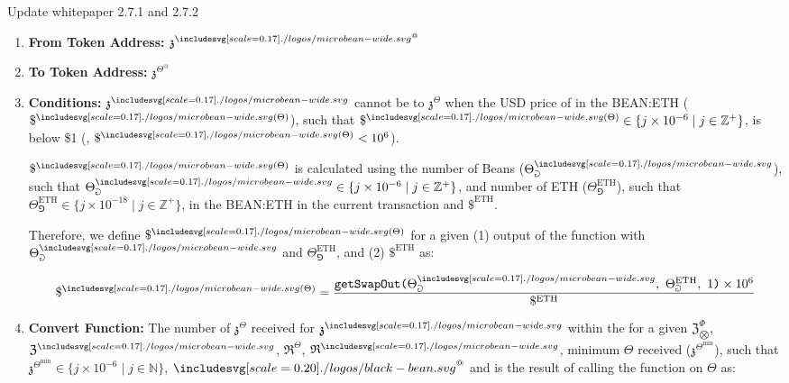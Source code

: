 Update whitepaper 2.7.1 and 2.7.2\documentclass[class=article, crop=false]{standalone}
\begin{document}
\begin{enumerate}
    \item \textbf{From Token Address:} $\mathfrak{z}^{\bean^@}$
    
    \item \textbf{To Token Address:} $\mathfrak{z}^{\Theta^@}$
    
    \item \textbf{Conditions:}  \hyperlink{ht233}{$\mathfrak{z}^{\bean}$} cannot be  to  \hyperlink{ht235}{$\mathfrak{z}^{\Theta}$} when the USD price of  in the BEAN:ETH  ($\$^{\bean(\Theta)}$), such that $\$^{\bean(\Theta)}\in \{j \times 10^{-6} \mid j \in \mathbb{Z}^{+} \}$, is below \$1 (, $\$^{\bean(\Theta)} < 10^6$). 

        $\$^{\bean(\Theta)}$ is calculated using the number of Beans ($\Theta_{\Game}^{\bean}$), such that $\Theta_{\Game}^{\bean} \in \{j \times 10^{-6} \mid j \in \mathbb{Z}^{+} \}$, and number of ETH ($\Theta_{\Game}^{\text{ETH}}$), such that $\Theta_{\Game}^{\text{ETH}} \in \{j \times 10^{-18} \mid j \in \mathbb{Z}^{+} \}$, in the BEAN:ETH  in the current transaction and $\$^{\text{ETH}}$.

        Therefore, we define $\$^{\bean(\Theta)}$ for a given (1) output of the   function with $\Theta_{\Game}^{\bean}$ and $\Theta_{\Game}^{\text{ETH}}$, and (2) $\$^{\text{ETH}}$ as:

            $$ \$^{\bean(\Theta)} = \frac{\code{getSwapOut(} \Theta_{\Game}^{\bean},\ \Theta_{\Game}^{\text{ETH}},\ 1 \code{)} \times 10^6 }{\$^{\text{ETH}}}$$

    \item \textbf{Convert Function:} The number of $\mathfrak{z}^{\Theta}$ received for   $\mathfrak{z}^{\bean}$ within the  for a given $\mathfrak{Z}_{\bigotimes}^{\Phi}$, $\mathfrak{Z}^{\bean}$, $\mathfrak{R}^{\Theta}$, $\mathfrak{R}^{\bean}$, minimum  $\Theta$ received ($\mathfrak{z}^{\Theta^{\text{min}}}$), such that $\mathfrak{z}^{\Theta^{\text{min}}} \in \{j \times 10^{-6} \mid j \in \mathbb{N} \}$, $\Beanstalk^{@}$ and  is the result of calling the   function on $\Theta$ as:


\end{enumerate}
\end{document}
